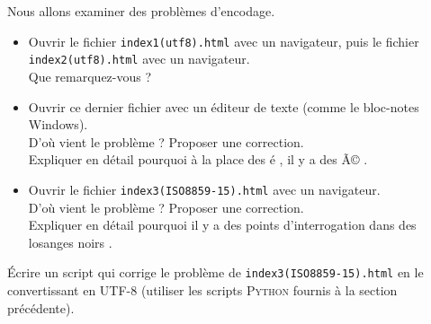 \begin{exercice} Nous allons examiner des problèmes d'encodage.
    \begin{itemize}
        \item Ouvrir le fichier \texttt{index1(utf8).html} avec un navigateur, puis le fichier \texttt{index2(utf8).html} avec un navigateur.\\
              Que remarquez-vous ?\\

        \item 	Ouvrir ce dernier fichier avec un éditeur de texte (comme le bloc-notes Windows).\\
              D'où vient le problème ? Proposer une correction.\\
              Expliquer en détail pourquoi à la place des \og é \fg{}, il y a des \og Ã© \fg{} .\\

        \item 	Ouvrir le fichier \texttt{index3(ISO8859-15).html} avec un navigateur.\\
              D'où vient le problème ? Proposer une correction.\\
              Expliquer en détail pourquoi il y a des \og points d'interrogation dans des losanges noirs \fg{}.\\
    \end{itemize}
\end{exercice}

\begin{exercice}
    \'Ecrire un script qui corrige le problème de  \texttt{index3(ISO8859-15).html} en le convertissant en UTF-8 (utiliser les scripts \textsc{Python} fournis à la section précédente).

\end{exercice}